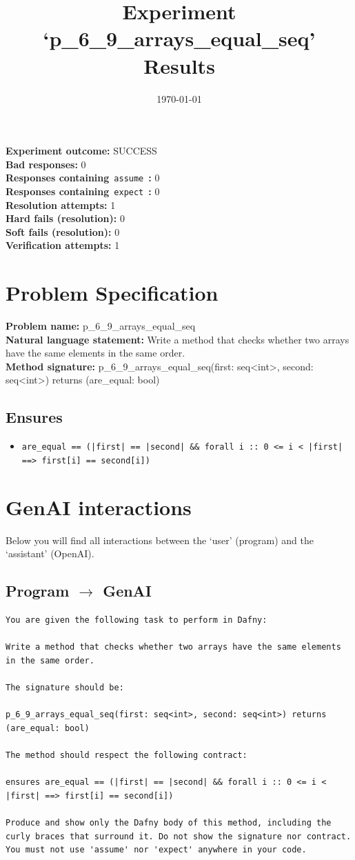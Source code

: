 \documentclass{article}
\begin{document}
\title{Experiment `p\_6\_9\_arrays\_equal\_seq' Results}
\author{\today}
\date{}
\maketitle
\textbf{Experiment outcome: }SUCCESS
\\\textbf{Bad responses: }0
\\\textbf{Responses containing}~\texttt{assume}~\textbf{: }0
\\\textbf{Responses containing}~\texttt{expect}~\textbf{: }0
\\\textbf{Resolution attempts: }1
\\\textbf{Hard fails (resolution): }0
\\\textbf{Soft fails (resolution): }0
\\\textbf{Verification attempts: }1
\section*{Problem Specification}
\textbf{Problem name: }p\_6\_9\_arrays\_equal\_seq
\\\textbf{Natural language statement: }Write a method that checks whether two arrays have the same elements in the same order.
\\\textbf{Method signature: }p\_6\_9\_arrays\_equal\_seq(first: seq<int>, second: seq<int>) returns (are\_equal: bool)
\subsection*{Ensures}
\begin{itemize}
\item \texttt{are\_equal == (|first| == |second| \&\& forall i :: 0 <= i < |first| ==> first[i] == second[i])}
\end{itemize}
\clearpage
\section*{GenAI interactions}
Below you will find all interactions between the `user' (program) and the `assistant' (OpenAI).
\subsection*{Program $\rightarrow$ GenAI}
\begin{lstlisting}
You are given the following task to perform in Dafny:

Write a method that checks whether two arrays have the same elements in the same order.

The signature should be:

p_6_9_arrays_equal_seq(first: seq<int>, second: seq<int>) returns (are_equal: bool)

The method should respect the following contract:

ensures are_equal == (|first| == |second| && forall i :: 0 <= i < |first| ==> first[i] == second[i])

Produce and show only the Dafny body of this method, including the curly braces that surround it. Do not show the signature nor contract. You must not use 'assume' nor 'expect' anywhere in your code.
\end{lstlisting}
\end{document}
